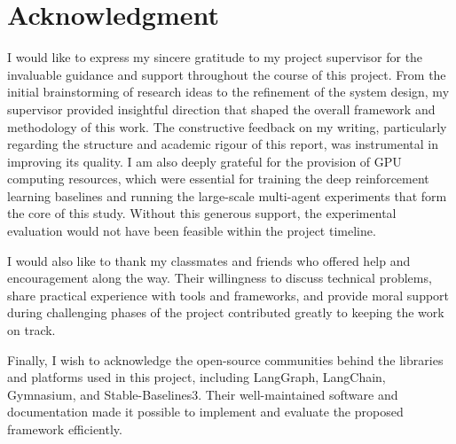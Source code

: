 \section*{Acknowledgment}
 {}
\vspace{-1em}
{\fontsize{12pt}{18pt}\selectfont 


I would like to express my sincere gratitude to my project supervisor for the invaluable guidance and support throughout the course of this project. From the initial brainstorming of research ideas to the refinement of the system design, my supervisor provided insightful direction that shaped the overall framework and methodology of this work. The constructive feedback on my writing, particularly regarding the structure and academic rigour of this report, was instrumental in improving its quality. I am also deeply grateful for the provision of GPU computing resources, which were essential for training the deep reinforcement learning baselines and running the large-scale multi-agent experiments that form the core of this study. Without this generous support, the experimental evaluation would not have been feasible within the project timeline.

I would also like to thank my classmates and friends who offered help and encouragement along the way. Their willingness to discuss technical problems, share practical experience with tools and frameworks, and provide moral support during challenging phases of the project contributed greatly to keeping the work on track.

Finally, I wish to acknowledge the open-source communities behind the libraries and platforms used in this project, including LangGraph, LangChain, Gymnasium, and Stable-Baselines3. Their well-maintained software and documentation made it possible to implement and evaluate the proposed framework efficiently.

}
